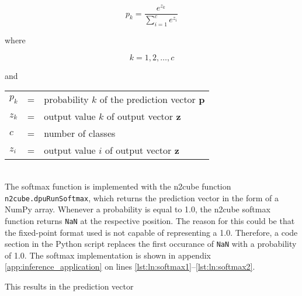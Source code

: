 \begin{equation}
  p_k = \frac{e^{z_k}}{\sum\limits_{i=1}^{c} e^{z_i}}
  \label{eq:softmax}
\end{equation}

where

\[
  k = 1, 2, \dots, c
\]

and

\begin{tabular}{lll}
  $p_k$ & = & probability $k$ of the prediction vector $\boldsymbol{p}$ \\
  $z_k$ & = & output value $k$ of output vector $\boldsymbol{z}$ \\
  $c$ & = & number of classes \\
  $z_i$ & = & output value $i$ of output vector $\boldsymbol{z}$ \\
\end{tabular}
\\

The softmax function is implemented with the \acrshort{n2cube} function \texttt{n2cube.dpuRunSoftmax}, which returns the prediction vector in the form of a NumPy array.
Whenever a probability is equal to \num{1.0}, the \acrshort{n2cube} softmax function returns \texttt{NaN} at the respective position.
The reason for this could be that the fixed-point format used is not capable of representing a \num{1.0}.
Therefore, a code section in the Python script replaces the first occurance of \texttt{NaN} with a probability of \num{1.0}.
The softmax implementation is shown in appendix \ref{app:inference_application} on lines \ref{lst:ln:softmax1}--\ref{lst:ln:softmax2}.

This results in the prediction vector


